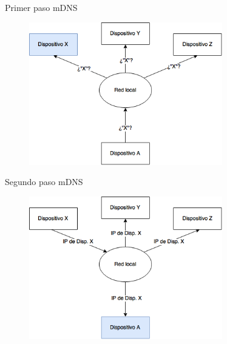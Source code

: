 \begin{frame}{Primer paso mDNS}
	\begin{figure}[H]
		\centering
		\includegraphics[width=0.75\textwidth]{./Imagenes/mdns1.png}
		\label{fig:mdns1}
	\end{figure}
\end{frame}

\begin{frame}{Segundo paso mDNS}
	\begin{figure}[H]
		\centering
		\includegraphics[width=0.75\textwidth]{./Imagenes/mdns2.png}
		\label{fig:mdns2}
	\end{figure}
\end{frame}




